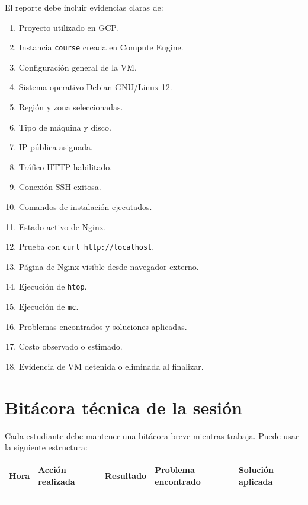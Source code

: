 \documentclass[
  coursetitle={Cómputo Nube y Tecnologías Emergentes},
  coursehours={96},
  coursedate={Verano 2026},
  doctype={Práctica},
  otherlangs={english,french},
  authorname={Lázaro},
  authorsurname={Bustio-Martínez},
  authortitle={PhD},
  role={Profesor Investigador},
  email={lbustio@inaoe.mx},
  phone={5559504000},
  ext={7459},
  institution={Instituto Nacional de Astrofísica, Óptica y Electrónica (INAOE)},
  department={Maestría en Ciencias en Tecnologías de Seguridad},
  address={Luis Enrique Erro 1, Sta. Ma. Tonantzintla, San Andrés Cholula, CP 72840, Puebla, México},
  margin={0.5in}
]{../../lbustio_lecture_notes}
\begin{document}
El reporte debe incluir evidencias claras de:

\begin{enumerate}
    \item Proyecto utilizado en GCP.
    \item Instancia \texttt{course} creada en Compute Engine.
    \item Configuración general de la VM.
    \item Sistema operativo Debian GNU/Linux 12.
    \item Región y zona seleccionadas.
    \item Tipo de máquina y disco.
    \item IP pública asignada.
    \item Tráfico HTTP habilitado.
    \item Conexión SSH exitosa.
    \item Comandos de instalación ejecutados.
    \item Estado activo de Nginx.
    \item Prueba con \texttt{curl http://localhost}.
    \item Página de Nginx visible desde navegador externo.
    \item Ejecución de \texttt{htop}.
    \item Ejecución de \texttt{mc}.
    \item Problemas encontrados y soluciones aplicadas.
    \item Costo observado o estimado.
    \item Evidencia de VM detenida o eliminada al finalizar.
\end{enumerate}

\section{Bitácora técnica de la sesión}

Cada estudiante debe mantener una bitácora breve mientras trabaja. Puede usar la siguiente estructura:

\begin{table}[h]
\centering
\renewcommand{\arraystretch}{1.35}
\begin{tabularx}{\textwidth}{|p{1.55cm}|Y|Y|Y|Y|}
\hline
\textbf{Hora} & \textbf{Acción realizada} & \textbf{Resultado} & \textbf{Problema encontrado} & \textbf{Solución aplicada} \\
\hline
 & & & & \\
\hline
 & & & & \\
\hline
 & & & & \\
\hline
\end{tabularx}
\end{table}
\end{document}
